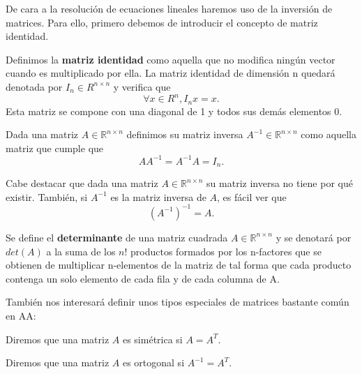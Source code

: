 De cara a la resolución de ecuaciones lineales haremos uso de la inversión de matrices. Para ello, primero debemos de introducir el concepto de matriz identidad.

\begin{definition}
    Definimos la \textbf{matriz identidad} como aquella que no modifica ningún vector cuando es multiplicado por ella. La matriz identidad de dimensión n quedará denotada por $I_n \in R^{n \times n}$ y verifica que
    \begin{equation}
        \forall x \in R^{n}, I_nx = x.
    \end{equation}
    Esta matriz se compone con una diagonal de 1 y todos sus demás elementos 0.
\end{definition}

\begin{definition}
    Dada una matriz $A \in \mathbb{R}^{n \times n}$ definimos su matriz inversa $A^{-1} \in \mathbb{R}^{n \times n}$ como aquella matriz que cumple que
    \begin{equation}
        AA^{-1}=A^{-1}A=I_n.
    \end{equation}

    Cabe destacar que dada una matriz $A \in \mathbb{R}^{n \times n}$ su matriz inversa no tiene por qué existir. También, si $A^{-1}$ es la matriz inversa de $A$, es fácil ver que
    \begin{equation}
        (A^{-1})^{-1}=A.
    \end{equation}
\end{definition}

\begin{definition}
    Se define el \textbf{determinante} de una matriz cuadrada $A \in \mathbb{R}^{n \times n}$ y se denotará por $det(A)$ a la suma de los $n!$ productos formados por los n-factores que se obtienen de multiplicar n-elementos de la matriz de tal forma que cada producto contenga un solo elemento de cada fila y de cada columna de A.
\end{definition}

También nos interesará definir unos tipos especiales de matrices bastante común en \ac{AA}:
\begin{definition}
    Diremos que una matriz $A$ es simétrica si $A = A^T$.
\end{definition}

\begin{definition}
    Diremos que una matriz $A$ es ortogonal si $A^{-1}=A^T$.
\end{definition}

